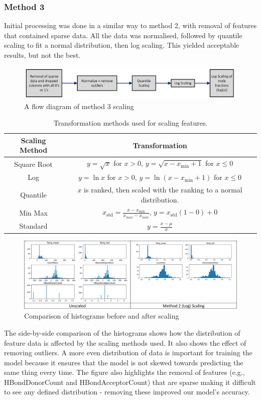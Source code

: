 \documentclass[11pt, titlepage]{article}
\begin{document}
\subsubsection{Method 3}
Initial processing was done in a similar way to method 2, with removal of features that contained sparse data. All the data was normalised, followed by quantile scaling to fit a normal distribution, then log scaling. This yielded acceptable results, but not the best.

\begin{figure}[ht]
\centering
\includegraphics[width=12cm]{media/Method3.png}
\caption{A flow diagram of method 3 scaling}
\end{figure}

\begin{table}[h!]
\centering
\begin{tabular}{|c|c|}
\hline
\textbf{Scaling Method} & \textbf{Transformation} \\ 
\hline
Square Root & $y=\sqrt{x}$ for $x>0$, $y=\sqrt{x-x_\text{min} +1}$ for $x\leq0$ \\ 
\hline
Log & $y=\ln{x}$ for $x>0$, $y=\ln(x-x_\text{min}+1)$ for $x\leq0$ \\ 
\hline
Quantile & $x$ is ranked, then scaled with the ranking to a normal distribution. \\ 
\hline
Min Max & $x_\text{std} = \frac{x-x_\text{min}}{x_{max}-x_{min}}$, $y = x_\text{std}(1-0)+0$ \\ 
\hline
Standard & $y=\frac{x-\mu}{\sigma}$ \\ 
\hline
\end{tabular}
\caption{Transformation methods used for scaling features.}
\label{table:scaling}
\end{table}

\begin{figure}[ht]
\centering
\includegraphics[width=16cm]{media/histograms.png}
\caption{Comparison of histograms before and after scaling}
\end{figure}
The side-by-side comparison of the histograms shows how the distribution of feature data is affected by the scaling methods used. It also shows the effect of removing outliers. A more even distribution of data is important for training the model because it ensures that the model is not skewed towards predicting the same thing every time. The figure also highlights the removal of features (e.g., HBondDonorCount and HBondAcceptorCount) that are sparse making it difficult to see any defined distribution - removing these improved our model's accuracy. 
\end{document}
